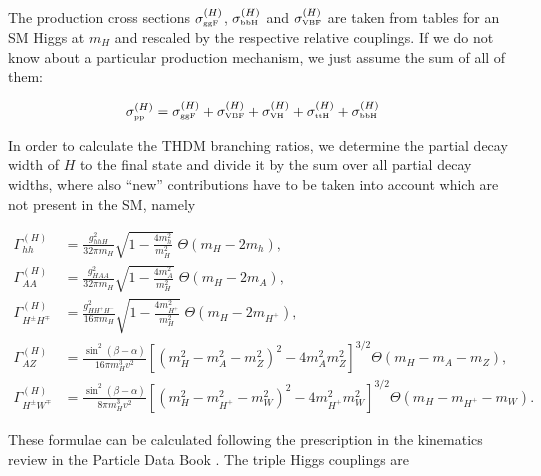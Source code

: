 \documentclass[preprint,3p,12pt]{elsarticle}
\begin{document}
{The production cross sections $\sigma ^{(H)}_{\text{\tiny{ggF}}}$, $\sigma ^{(H)}_{\text{\tiny{bbH}}}$ and $\sigma ^{(H)}_{\text{\tiny{VBF}}}$ are taken from tables for an SM Higgs at $m_H$ and rescaled by the respective relative couplings. If we do not know about a particular production mechanism, we just assume the sum of all of them:

\begin{align}
 \sigma ^{(H)}_{\text{\tiny{pp}}} &= \sigma ^{(H)}_{\text{\tiny{ggF}}} + \sigma ^{(H)}_{\text{\tiny{VBF}}} + \sigma ^{(H)}_{\text{\tiny{VH}}} + \sigma ^{(H)}_{\text{\tiny{ttH}}} + \sigma ^{(H)}_{\text{\tiny{bbH}}} \nonumber
\end{align}

In order to calculate the THDM branching ratios, we determine the partial decay width of $H$ to the final state and divide it by the sum over all partial decay widths, where also ``new'' contributions have to be taken into account which are not present in the SM, namely

\begin{align}
 \Gamma ^{(H)}_{hh} &= \frac{g_{hhH}^2}{32 \pi m_H } \sqrt{1 - \frac{4 m_h^2}{m_H^2}} \; \Theta (m_H-2m_h), \nonumber \\
 \Gamma ^{(H)}_{AA} &= \frac{g_{HAA}^2}{32 \pi m_H } \sqrt{1 - \frac{4 m_A^2}{m_H^2}} \; \Theta (m_H-2m_A), \nonumber \\
 \Gamma ^{(H)}_{H^\pm H^\mp} &= \frac{g_{HH^+H^-}^2}{16 \pi m_H } \sqrt{1 - \frac{4 m_{H^+}^2}{m_H^2}} \; \Theta (m_H-2m_{H^+}), \nonumber \\
 \Gamma ^{(H)}_{AZ} &= \frac{\sin^2 (\beta -\alpha )}{16 \pi m_H^3 v^2} \left[ (m_H^2-m_A^2-m_Z^2)^2-4 m_A^2 m_Z^2\right] ^{3/2}  \Theta (m_H-m_A-m_Z), \nonumber \\
 \Gamma ^{(H)}_{H^\pm W^\mp } &= \frac{\sin^2 (\beta -\alpha )}{8 \pi m_H^3 v^2} \left[ (m_H^2-m_{H^+}^2-m_W^2)^2-4 m_{H^+}^2 m_W^2\right] ^{3/2}  \Theta (m_H-m_{H^+}-m_W). \nonumber 
\end{align}

These formulae can be calculated following the prescription in the kinematics review in the Particle Data Book \cite{Agashe:2014kda}. The triple Higgs couplings are

}
\end{document}
